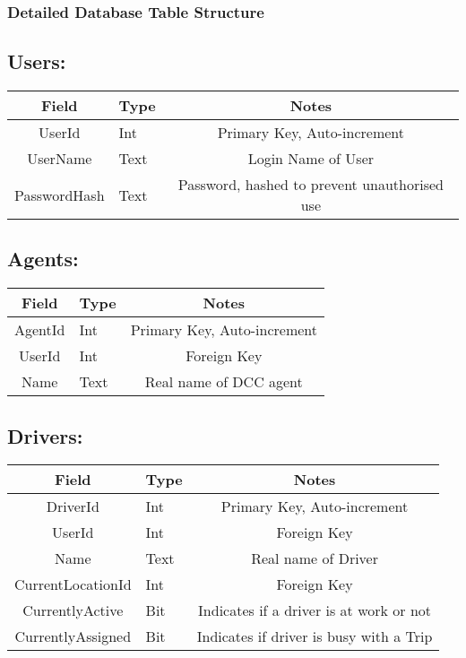 \documentclass[10pt, onecolumn]{witseiepaper}
\begin{document}
\subsubsection{Detailed Database Table Structure}
\subsection*{Users:}
\begin{tabular}{|c|l|c|}
\hline 
Field & Type & Notes\\ 
\hline 
UserId & Int & Primary Key, Auto-increment\\
\hline 
UserName & Text & Login Name of User\\
\hline 
PasswordHash & Text & Password, hashed to prevent unauthorised use\\
\hline
\end{tabular}

\subsection*{Agents:}
\begin{tabular}{|c|l|c|}
\hline 
Field & Type & Notes\\ 
\hline 
AgentId & Int & Primary Key, Auto-increment\\
\hline 
UserId & Int & Foreign Key\\
\hline 
Name & Text & Real name of DCC agent\\
\hline
\end{tabular}

\subsection*{Drivers:}
\begin{tabular}{|c|l|c|}
\hline 
Field & Type & Notes\\ 
\hline 
DriverId & Int & Primary Key, Auto-increment\\
\hline 
UserId & Int & Foreign Key\\
\hline 
Name & Text & Real name of Driver\\
\hline
CurrentLocationId & Int & Foreign Key\\
\hline
CurrentlyActive & Bit & Indicates if a driver is at work or not\\
\hline
CurrentlyAssigned & Bit & Indicates if driver is busy with a Trip\\
\hline
\end{tabular}
\end{document}
